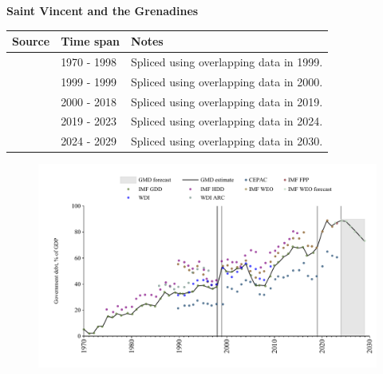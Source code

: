\documentclass[12pt,a4paper,landscape]{article}
\begin{document}
\begin{adjustbox}{max totalsize={\paperwidth}{\paperheight},center}
\begin{minipage}[t][\textheight][t]{\textwidth}
\vspace*{0.5cm}
{}
\begin{center}
{\Large\bfseries Saint Vincent and the Grenadines}
\end{center}
\vspace{0.5cm}
\begin{table}[H]
\centering
\small
\begin{tabular}{|l|l|l|}
\hline
\textbf{Source} & \textbf{Time span} & \textbf{Notes} \\
\hline
\rowcolor{white}\cite{IMF_GDD}& 1970 - 1998 &Spliced using overlapping data in 1999.\\
\rowcolor{lightgray}\cite{IMF_FPP}& 1999 - 1999 &Spliced using overlapping data in 2000.\\
\rowcolor{white}\cite{IMF_GDD}& 2000 - 2018 &Spliced using overlapping data in 2019.\\
\rowcolor{lightgray}\cite{IMF_FPP}& 2019 - 2023 &Spliced using overlapping data in 2024.\\
\rowcolor{white}\cite{IMF_WEO_forecast}& 2024 - 2029 &Spliced using overlapping data in 2030.\\
\hline
\end{tabular}
\end{table}
\begin{figure}[H]
\centering
\includegraphics[width=\textwidth,height=0.6\textheight,keepaspectratio]{graphs/VCT_govdebt_GDP.pdf}
\end{figure}
\end{minipage}
\end{adjustbox}
\end{document}
